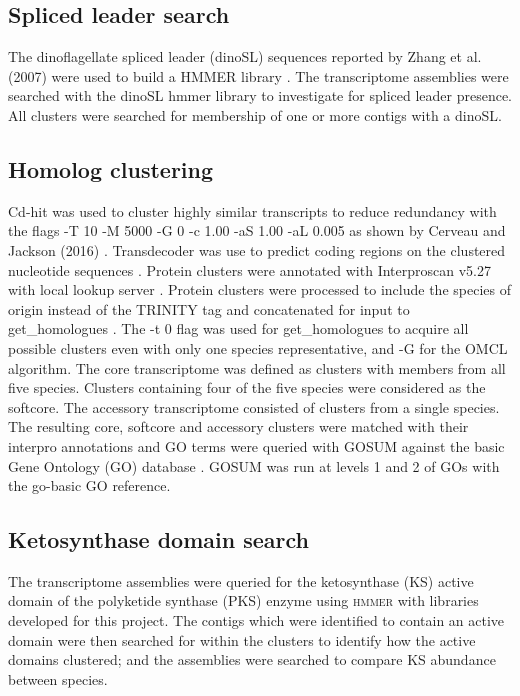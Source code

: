\documentclass[12pt]{article}
\begin{document}
\subsection{Spliced leader search}
The dinoflagellate spliced leader (dinoSL) sequences reported by Zhang et al. (2007) were used to build a \textsc{HMMER} library \cite{zhang2007spliced}. 
The transcriptome assemblies were searched with the dinoSL hmmer library to investigate for spliced leader presence. 
All clusters were searched for membership of one or more contigs with a dinoSL.

\subsection{Homolog clustering}
Cd-hit was used to cluster highly similar transcripts to reduce redundancy with the flags -T 10 -M 5000 -G 0 -c 1.00 -aS 1.00 -aL 0.005 as shown by Cerveau and Jackson (2016) \cite{cerveau2016combining,fu2012cd}. 
Transdecoder was use to predict coding regions on the clustered nucleotide sequences \cite{haas2016transdecoder}.
Protein clusters were annotated with Interproscan v5.27 with local lookup server \cite{quevillon2005interproscan}.
Protein clusters were processed to include the species of origin instead of the TRINITY tag and concatenated for input to get\_homologues \cite{vinuesa2015robust}. 
The -t 0 flag was used for get\_homologues to acquire all possible clusters even with only one species representative, and -G for the OMCL algorithm. 
The core transcriptome was defined as clusters with members from all five species. 
Clusters containing four of the five species were considered as the softcore. 
The accessory transcriptome consisted of clusters from a single species. 
The resulting core, softcore and accessory clusters were matched with their interpro annotations and GO terms were queried with GOSUM against the basic Gene Ontology (GO) database \cite{timgosum,ashburner2000gene,gene2016expansion}. 
GOSUM was run at levels 1 and 2 of GOs with the go-basic GO reference. 

\subsection{Ketosynthase domain search}
The transcriptome assemblies were queried for the ketosynthase (KS) active domain of the polyketide synthase (PKS) enzyme using \textsc{hmmer} \cite{eddy2015hmmer} with libraries developed for this project. 
The contigs which were identified to contain an active domain were then searched for within the clusters to identify how the active domains clustered; and the assemblies were searched to compare KS abundance between species. 
\end{document}
